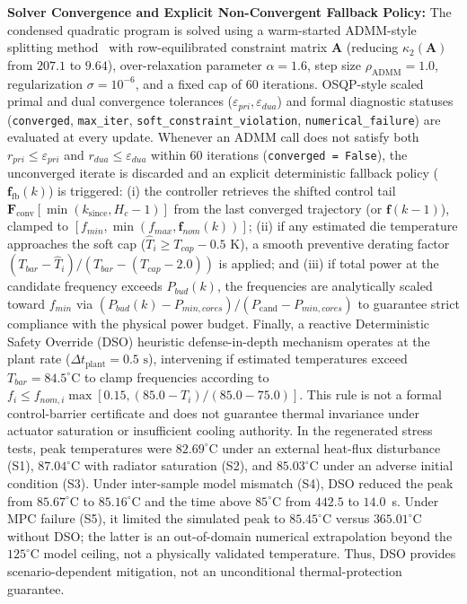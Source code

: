\documentclass[a4paper,fleqn]{cas-dc}
\begin{document}
\textbf{Solver Convergence and Explicit Non-Convergent Fallback Policy:}
The condensed quadratic program is solved using a warm-started ADMM-style splitting method~\citep{boyd2011admm, stellato2020osqp} with row-equilibrated constraint matrix $\mathbf{A}$ (reducing $\kappa_2(\mathbf{A})$ from $207.1$ to $9.64$), over-relaxation parameter $\alpha = 1.6$, step size $\rho_{\mathrm{ADMM}} = 1.0$, regularization $\sigma = 10^{-6}$, and a fixed cap of 60 iterations. OSQP-style scaled primal and dual convergence tolerances ($\varepsilon_{pri}, \varepsilon_{dua}$) and formal diagnostic statuses (\texttt{converged}, \texttt{max\_iter}, \texttt{soft\_constraint\_violation}, \texttt{numerical\_failure}) are evaluated at every update. Whenever an ADMM call does not satisfy both $r_{pri} \le \varepsilon_{pri}$ and $r_{dua} \le \varepsilon_{dua}$ within 60 iterations (\texttt{converged = False}), the unconverged iterate is discarded and an explicit deterministic fallback policy ($\mathbf{f}_{\mathrm{fb}}(k)$) is triggered: (i) the controller retrieves the shifted control tail $\mathbf{F}_{\mathrm{conv}}[\min(k_{\mathrm{since}}, H_c - 1)]$ from the last converged trajectory (or $\mathbf{f}(k-1)$), clamped to $[f_{min}, \min(f_{max}, \mathbf{f}_{nom}(k))]$; (ii) if any estimated die temperature approaches the soft cap ($\hat{T}_i \ge T_{cap} - 0.5\text{ K}$), a smooth preventive derating factor $(T_{bar} - \hat{T}_i)/(T_{bar} - (T_{cap} - 2.0))$ is applied; and (iii) if total power at the candidate frequency exceeds $P_{bud}(k)$, the frequencies are analytically scaled toward $f_{min}$ via $(P_{bud}(k) - P_{min,cores})/(P_{\mathrm{cand}} - P_{min,cores})$ to guarantee strict compliance with the physical power budget. Finally, a reactive Deterministic Safety Override (DSO) heuristic defense-in-depth mechanism operates at the plant rate ($\Delta t_{\text{plant}} = 0.5\text{ s}$), intervening if estimated temperatures exceed $T_{bar} = 84.5^\circ\text{C}$ to clamp frequencies according to $f_i \le f_{nom,i} \max[0.15, (85.0 - T_i)/(85.0 - 75.0)]$. This rule is not a formal control-barrier certificate and does not guarantee thermal invariance under actuator saturation or insufficient cooling authority. In the regenerated stress tests, peak temperatures were $82.69^\circ\text{C}$ under an external heat-flux disturbance (S1), $87.04^\circ\text{C}$ with radiator saturation (S2), and $85.03^\circ\text{C}$ under an adverse initial condition (S3). Under inter-sample model mismatch (S4), DSO reduced the peak from $85.67^\circ\text{C}$ to $85.16^\circ\text{C}$ and the time above $85^\circ\text{C}$ from $442.5$ to $14.0$~s. Under MPC failure (S5), it limited the simulated peak to $85.45^\circ\text{C}$ versus $365.01^\circ\text{C}$ without DSO; the latter is an out-of-domain numerical extrapolation beyond the $125^\circ\text{C}$ model ceiling, not a physically validated temperature. Thus, DSO provides scenario-dependent mitigation, not an unconditional thermal-protection guarantee.
\end{document}
